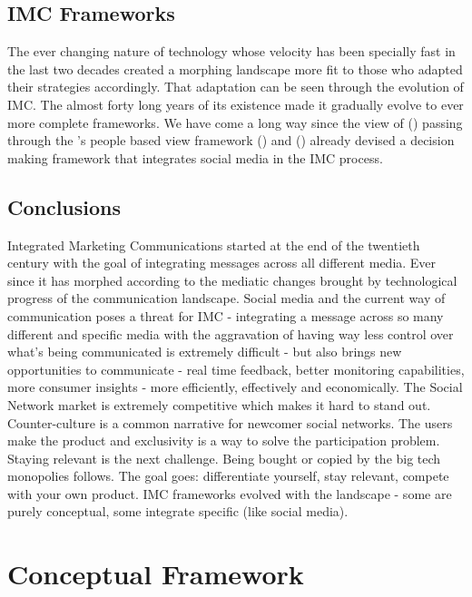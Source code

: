 \documentclass[12pt]{article}
\begin{document}
 \subsection{IMC Frameworks}\label{fw}
 
The ever changing nature of technology whose velocity has been specially fast in the last two decades created a morphing landscape more fit to those who adapted their strategies accordingly.  That adaptation can be seen through the evolution of IMC. The almost forty long years of its existence made it gradually evolve to ever more complete frameworks. We have come a long way since the view of \citeauthor{nowak} (\citeyear{nowak}) passing through the \citeauthor{kliatchko}'s people based view framework (\citeyear{kliatchko}) and \citeauthor{valos}  (\citeyear{valos}) already devised a decision making framework that integrates social media in the IMC process. 
 
  \subsection{Conclusions}\label{conclusions}
  
  Integrated Marketing Communications started at the end of the twentieth century with the goal of integrating messages across all different media. Ever since it has morphed according to the mediatic changes brought by technological progress of the communication landscape. Social media and the current way of communication poses a threat for IMC - integrating a message across so many different and specific media with the aggravation of having way less control over what’s being communicated is extremely difficult - but also brings new opportunities to communicate - real time feedback, better monitoring capabilities, more consumer insights - more efficiently, effectively and economically. The Social Network market is extremely competitive which makes it hard to stand out. Counter-culture is a common narrative for newcomer social networks. The users make the product and exclusivity is a way to solve the participation problem. Staying relevant is the next challenge. Being bought or copied by the big tech monopolies follows. The goal goes: differentiate yourself, stay relevant, compete with your own product. IMC frameworks evolved with the landscape - some are purely conceptual, some integrate specific (like social media). 
 
\pagebreak

\section{Conceptual Framework}
\end{document}
